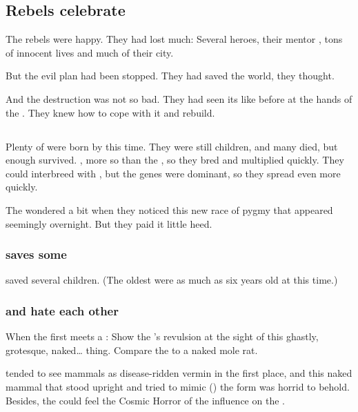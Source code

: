 \subsection{Rebels celebrate}
The \nephilic{} rebels were happy.
They had lost much: 
Several heroes, their mentor \Vexstrasshin{}, tons of innocent lives and much of their city. 

But the evil plan had been stopped. 
They had saved the world, they thought. 

And the destruction was not so bad. 
They had seen its like before at the hands of the \dragons. 
They knew how to cope with it and rebuild. 









\subsection{\Humans}
Plenty of \humans{} were born by this time. 
They were still children, and many died, but enough survived. 
, more so than the \nephilim, so they bred and multiplied quickly. 
They could interbreed with \nephilim, but the \human{} genes were dominant, so they spread even more quickly. 

The \dragons{} wondered a bit when they noticed this new race of pygmy \nephilim{} that appeared seemingly overnight. 
But they paid it little heed.





\subsubsection{\Morza saves some \humans}
\Morza saved several \human children. 
(The oldest \humans were as much as six years old at this time.)





\subsubsection{\Scathae and \humans hate each other}
When the first \scatha meets a \human: 
Show the \scatha's revulsion at the sight of this ghastly, grotesque, naked\ldots{} thing. 
Compare the \human to a naked mole rat. 

\Scathae tended to see mammals as disease-ridden vermin in the first place, and this naked mammal that stood upright and tried to mimic () the \scathaese form was horrid to behold. 
Besides, the \scatha could feel the Cosmic Horror of the \pps{\banes} influence on the \human. 

